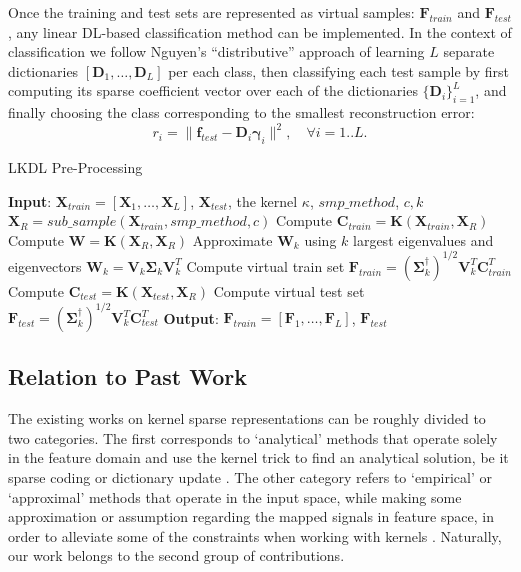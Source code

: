 \documentclass[journal]{IEEEtran}
\newcommand{\bD}{\mathbf{D}}
\newcommand{\bX}{\mathbf{X}}
\newcommand{\bK}{\mathbf{K}}
\newcommand{\bF}{\mathbf{F}}
\newcommand{\bC}{\mathbf{C}}
\newcommand{\bW}{\mathbf{W}}
\newcommand{\bV}{\mathbf{V}}
\newcommand{\bgamma}{\boldsymbol{\gamma}}
\begin{document}
Once the training and test sets are represented as virtual samples: $\bF_{train}$ and $\bF_{test}$, any linear DL-based classification method can be implemented. In the context of classification we follow Nguyen's ``distributive'' approach \cite{KDL2} of learning $L$ separate dictionaries $[\bD_1,\ldots,\bD_L]$ per each class, then classifying each test sample by first computing its sparse coefficient vector over each of the dictionaries $\{\bD_i\}_{i=1}^L$, and finally choosing the class corresponding to the smallest reconstruction error:
\begin{equation}\label{eq:classification}
r_i = \|\boldsymbol{f}_{test}-\bD_i \bgamma_i\|^2, \quad \forall i=1..L.
\end{equation}

\begin{algorithm}
\caption{LKDL Pre-Processing}\label{LKDL-Preprocessing}
\begin{algorithmic}[1]
\State \textbf{Input}: $\bX_{train}=\left[\bX_1,\ldots,\bX_L\right]$, $\bX_{test}$, the kernel $\kappa$, $smp\_method$, $c, k$
\State $\bX_R=sub\_sample(\bX_{train},smp\_method,c)$
\State Compute $\bC_{train}=\bK(\bX_{train},\bX_R)$
\State Compute $\bW=\bK(\bX_R,\bX_R)$
\State Approximate $\bW_k$ using $k$ largest eigenvalues and eigenvectors $\bW_k=\bV_k\boldsymbol{\Sigma}_k\bV_k^T$
\State Compute virtual train set $\bF_{train} = \left(\boldsymbol{\Sigma}_k^{\dagger} \right)^{1/2} \mathbf{V}_k^T \bC_{train}^T$
\State Compute $\bC_{test}=\bK(\bX_{test},\bX_R)$
\State Compute virtual test set $\bF_{test} = \left(\boldsymbol{\Sigma}_k^{\dagger} \right)^{1/2} \mathbf{V}_k^T \bC_{test}^T$
\State \textbf{Output}: $\bF_{train}=\left[\bF_1,\ldots,\bF_L\right]$, $\bF_{test}$
\end{algorithmic}
\end{algorithm}

\subsection{Relation to Past Work}\label{SS:literature}

The existing works on kernel sparse representations can be roughly divided to two categories.
The first corresponds to `analytical' methods that operate solely in the feature domain and use the kernel trick to find an analytical solution, be it sparse coding or dictionary update \cite{KernelOMP,KSR,KDL,KernelizedDL}. The other category refers to `empirical' or `approximal' methods that operate in the input space, while making some approximation or assumption regarding the mapped signals in feature space, in order to alleviate some of the constraints when working with kernels \cite{KMP,KBP,KernelSRC1}. Naturally, our work belongs to the second group of contributions.
\end{document}
